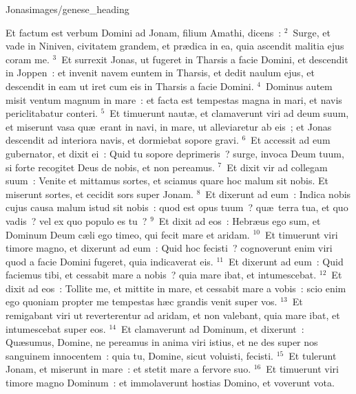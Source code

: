 {Jonas}{images/genese_heading}


\lettrine[lines=10,image=true,loversize=0.05,lraise=-0.03]{E}{}t factum est verbum Domini ad Jonam, filium Amathi, dicens~:
${}^{2}$~Surge, et vade in Niniven, civitatem grandem, et pr\ae dica in ea, quia ascendit malitia ejus coram me.
${}^{3}$~Et surrexit Jonas, ut fugeret in Tharsis a facie Domini, et descendit in Joppen~: et invenit navem euntem in Tharsis, et dedit naulum ejus, et descendit in eam ut iret cum eis in Tharsis a facie Domini.
${}^{4}$~Dominus autem misit ventum magnum in mare~: et facta est tempestas magna in mari, et navis periclitabatur conteri.
${}^{5}$~Et timuerunt naut\ae , et clamaverunt viri ad deum suum, et miserunt vasa qu\ae\ erant in navi, in mare, ut alleviaretur ab eis~; et Jonas descendit ad interiora navis, et dormiebat sopore gravi.
${}^{6}$~Et accessit ad eum gubernator, et dixit ei~: Quid tu sopore deprimeris~? surge, invoca Deum tuum, si forte recogitet Deus de nobis, et non pereamus.
${}^{7}$~Et dixit vir ad collegam suum~: Venite et mittamus sortes, et sciamus quare hoc malum sit nobis. Et miserunt sortes, et cecidit sors super Jonam.
${}^{8}$~Et dixerunt ad eum~: Indica nobis cujus causa malum istud sit nobis~: quod est opus tuum~? qu\ae\ terra tua, et quo vadis~? vel ex quo populo es tu~?
${}^{9}$~Et dixit ad eos~: Hebr\ae us ego sum, et Dominum Deum c\ae li ego timeo, qui fecit mare et aridam.
${}^{10}$~Et timuerunt viri timore magno, et dixerunt ad eum~: Quid hoc fecisti~? cognoverunt enim viri quod a facie Domini fugeret, quia indicaverat eis.
${}^{11}$~Et dixerunt ad eum~: Quid faciemus tibi, et cessabit mare a nobis~? quia mare ibat, et intumescebat.
${}^{12}$~Et dixit ad eos~: Tollite me, et mittite in mare, et cessabit mare a vobis~: scio enim ego quoniam propter me tempestas h\ae c grandis venit super vos.
${}^{13}$~Et remigabant viri ut reverterentur ad aridam, et non valebant, quia mare ibat, et intumescebat super eos.
${}^{14}$~Et clamaverunt ad Dominum, et dixerunt~: Qu\ae sumus, Domine, ne pereamus in anima viri istius, et ne des super nos sanguinem innocentem~: quia tu, Domine, sicut voluisti, fecisti.
${}^{15}$~Et tulerunt Jonam, et miserunt in mare~: et stetit mare a fervore suo.
${}^{16}$~Et timuerunt viri timore magno Dominum~: et immolaverunt hostias Domino, et voverunt vota.

